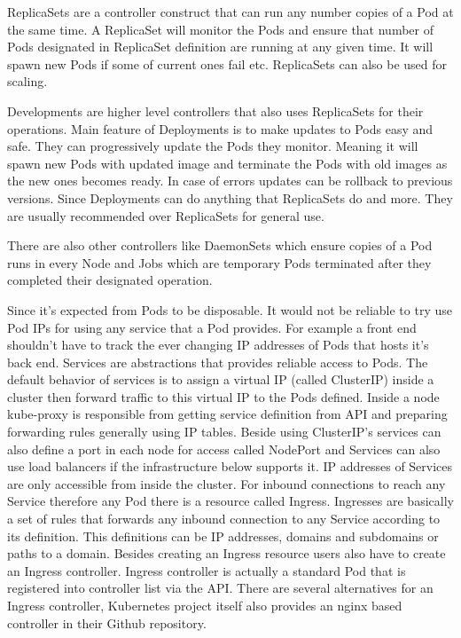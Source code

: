 \documentclass[12pt,oneandhalf,chaparabic,ceng,ms,eng,oneside,pntc]{gsufbe}
\begin{document}
ReplicaSets are a controller construct that can run any number copies of a Pod at the same time. A 
ReplicaSet will monitor the Pods and ensure that number of Pods designated in ReplicaSet definition are
running at any given time. It will spawn new Pods if some of current ones fail etc. ReplicaSets can
also be used for scaling. 

Developments are higher level controllers that also uses ReplicaSets for their operations. Main feature
of Deployments is to make updates to Pods easy and safe. They can progressively update the Pods they
monitor. Meaning it will spawn new Pods with updated image and terminate the Pods with old images as
the new ones becomes ready. In case of errors updates can be rollback to previous versions. Since
Deployments can do anything that ReplicaSets do and more. They are usually recommended over ReplicaSets
for general use.

There are also other controllers like DaemonSets which ensure copies of a Pod runs in every Node and
Jobs which are temporary Pods terminated after they completed their designated operation.

Since it’s expected from Pods to be disposable. It would not be reliable to try use Pod IPs for using
any service that a Pod provides. For example a front end shouldn’t have to track the ever changing IP
addresses of Pods that hosts it’s back end. Services are abstractions that provides reliable access to
Pods. The default behavior of services is to assign a virtual IP (called ClusterIP) inside a cluster
then forward traffic to this virtual IP to the Pods defined. Inside a node kube-proxy is responsible
from getting service definition from API and preparing forwarding rules generally using IP tables.
Beside using ClusterIP’s services can also define a port in each node for access called NodePort and
Services can also use load balancers if the infrastructure below supports it.
IP addresses of Services are only accessible from inside the cluster. For inbound connections to reach
any Service therefore any Pod there is a resource called Ingress. Ingresses are basically a set of rules
that forwards any inbound connection to any Service according to its definition. This definitions can
be IP addresses, domains and subdomains or paths to a domain. Besides creating an Ingress resource
users also have to create an Ingress controller. Ingress controller is actually a standard Pod that is
registered into controller list via the API. There are several alternatives for an Ingress controller,
Kubernetes project itself also provides an nginx based controller in their Github repository.
\end{document}
